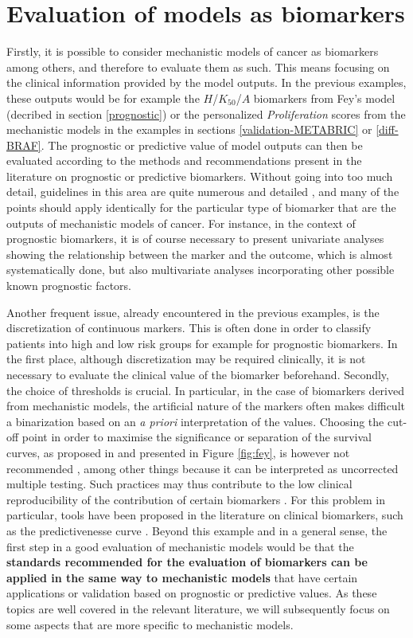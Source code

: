 \documentclass[a4paper,12pt,twoside,onecolumn,openright,final,oldfontcommands]{memoir}
\begin{document}
\section{Evaluation of models as
biomarkers}\label{evaluation-of-models-as-biomarkers}

Firstly, it is possible to consider mechanistic models of cancer as
biomarkers among others, and therefore to evaluate them as such. This
means focusing on the clinical information provided by the model
outputs. In the previous examples, these outputs would be for example
the \(H\)/\(K_{50}\)/\(A\) biomarkers from Fey's model (decribed in
section \ref{prognostic}) or the personalized \emph{Proliferation}
scores from the mechanistic models in the examples in sections
\ref{validation-METABRIC} or \ref{diff-BRAF}. The prognostic or
predictive value of model outputs can then be evaluated according to the
methods and recommendations present in the literature on prognostic or
predictive biomarkers. Without going into too much detail, guidelines in
this area are quite numerous and detailed
\citep{mcshane2005reporting, sauerbrei2018reporting}, and many of the
points should apply identically for the particular type of biomarker
that are the outputs of mechanistic models of cancer. For instance, in
the context of prognostic biomarkers, it is of course necessary to
present univariate analyses showing the relationship between the marker
and the outcome, which is almost systematically done, but also
multivariate analyses incorporating other possible known prognostic
factors.

Another frequent issue, already encountered in the previous examples, is
the discretization of continuous markers. This is often done in order to
classify patients into high and low risk groups for example for
prognostic biomarkers. In the first place, although discretization may
be required clinically, it is not necessary to evaluate the clinical
value of the biomarker beforehand. Secondly, the choice of thresholds is
crucial. In particular, in the case of biomarkers derived from
mechanistic models, the artificial nature of the markers often makes
difficult a binarization based on an \emph{a priori} interpretation of
the values. Choosing the cut-off point in order to maximise the
significance or separation of the survival curves, as proposed in
\citet{fey2015signaling} and presented in Figure \ref{fig:fey}, is
however not recommended \citep{altman1994dangers}, among other things
because it can be interpreted as uncorrected multiple testing. Such
practices may thus contribute to the low clinical reproducibility of the
contribution of certain biomarkers \citep{hilsenbeck1992so}. For this
problem in particular, tools have been proposed in the literature on
clinical biomarkers, such as the predictivenesse curve
\citep{mboup2020evaluating}. Beyond this example and in a general sense,
the first step in a good evaluation of mechanistic models would be that
the \textbf{standards recommended for the evaluation of biomarkers can
be applied in the same way to mechanistic models} that have certain
applications or validation based on prognostic or predictive values. As
these topics are well covered in the relevant literature, we will
subsequently focus on some aspects that are more specific to mechanistic
models.
\end{document}
